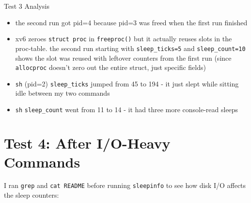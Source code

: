 \documentclass[12pt]{report}
\begin{document}
\begin{exbox}{Test 3 Analysis}
    \begin{itemize}[noitemsep]
        \item the second run got pid=4 because pid=3 was freed when the first run finished
        \item xv6 zeroes \texttt{struct proc} in \texttt{freeproc()} but it actually reuses slots in the proc-table. the second run starting with \texttt{sleep\_ticks=5} and \texttt{sleep\_count=10} shows the slot was reused with leftover counters from the first run (since \texttt{allocproc} doesn't zero out the entire struct, just specific fields)
        \item \texttt{sh} (pid=2) \texttt{sleep\_ticks} jumped from 45 to 194 - it just slept while sitting idle between my two commands
        \item \texttt{sh} \texttt{sleep\_count} went from 11 to 14 - it had three more console-read sleeps
    \end{itemize}
\end{exbox}

\section{Test 4: After I/O-Heavy Commands}

I ran \texttt{grep} and \texttt{cat README} before running \texttt{sleepinfo} to see how disk I/O affects the sleep counters:

\end{document}
